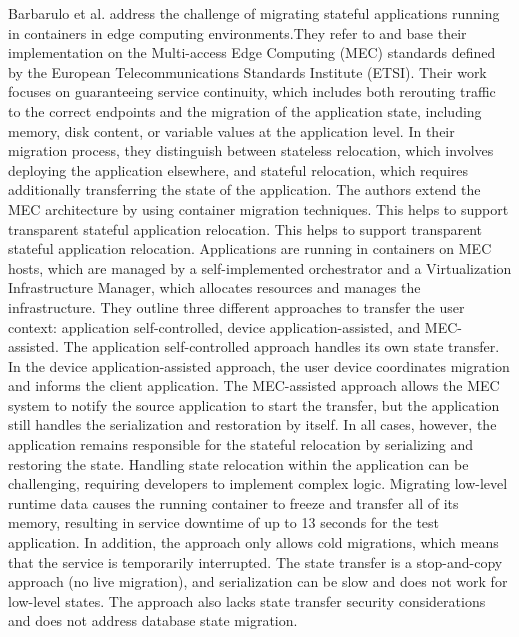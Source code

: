Barbarulo et al. address the challenge of migrating stateful applications running in containers in edge computing environments.They refer to and base their implementation  on the Multi-access Edge Computing (MEC) standards defined by the European Telecommunications Standards Institute (ETSI). Their work focuses on guaranteeing service continuity, which includes both rerouting traffic to the correct endpoints and the migration of the application state, including memory, disk content, or variable values at the application level. In their migration  process, they distinguish between stateless relocation, which involves deploying the application elsewhere, and stateful relocation, which requires additionally transferring the state of the application. The authors extend the MEC architecture by using container migration techniques. This helps to support transparent stateful application relocation. This helps to support transparent stateful application relocation. Applications are running in containers on MEC hosts, which are managed by a self-implemented orchestrator and a Virtualization Infrastructure Manager, which allocates resources and manages the infrastructure. They outline three different approaches to transfer the user context: application self-controlled, device application-assisted, and MEC-assisted. The application self-controlled approach handles its own state transfer. In the device application-assisted approach, the user device coordinates migration and informs the client application. The MEC-assisted approach allows the MEC system to notify the source application to start the transfer, but the application still handles the serialization and restoration by itself. In all cases, however, the application remains responsible for the stateful relocation by serializing and restoring the state. Handling state relocation within the application can be challenging, requiring developers to implement complex logic. Migrating low-level runtime data causes the running container to freeze and transfer all of its memory, resulting in service downtime of up to 13 seconds for the test application. In addition, the approach only allows cold migrations, which means that the service is temporarily interrupted. The state transfer is a stop-and-copy approach (no live migration), and serialization can be slow and does not work for low-level states. The approach also lacks state transfer security considerations and does not address database state migration.

